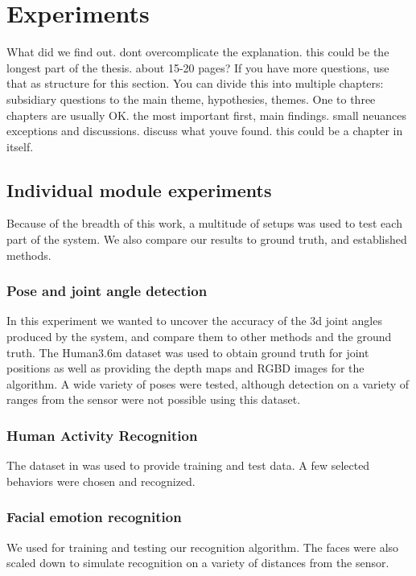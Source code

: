 \chapter{Experiments}                     %

{\color{red}What did we find out. dont overcomplicate the explanation. this could be the longest part of the thesis. about 15-20 pages? If you have more questions, use that as structure for this section. You can divide this into multiple chapters: subsidiary questions to the main theme, hypothesies, themes. One to three chapters are usually OK. the most important first, main findings. small neuances exceptions and discussions. discuss what youve found. this could be a chapter in itself.}

\section{Individual module experiments}
Because of the breadth of this work, a multitude of setups was used to test each part of the system. We also compare our results to ground truth, and established methods.

\subsection{Pose and joint angle detection}
In this experiment we wanted to uncover the accuracy of the 3d joint angles produced by the system, and compare them to other methods and the ground truth. The {\color{red}Human3.6m} dataset was used to obtain ground truth for joint positions as well as providing the depth maps and RGBD images for the algorithm. A wide variety of poses were tested, although detection on a variety of ranges from the sensor were not possible using this dataset.

\subsection{Human Activity Recognition}
The dataset in \cite{berkeley_mhad} was used to provide training and test data. A few selected behaviors were chosen and recognized. 

\subsection{Facial emotion recognition}
We used \cite{radboud_faces} for training and testing our recognition algorithm. The faces were also scaled down to simulate recognition on a variety of distances from the sensor.

